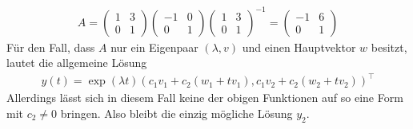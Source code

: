 \begin{solution}
\begin{align*}
A =
  \begin{pmatrix}
    1 & 3 \\ 0 & 1
  \end{pmatrix}
  \begin{pmatrix}
    -1 & 0 \\ 0 & 1
  \end{pmatrix}
  \begin{pmatrix}
    1 & 3 \\ 0 & 1
  \end{pmatrix}^{-1}
  =
  \begin{pmatrix}
    -1 & 6 \\ 0 & 1
  \end{pmatrix}
\end{align*}
Für den Fall, dass $A$ nur ein Eigenpaar $(\lambda,v)$ und einen Hauptvektor $w$
besitzt, lautet die allgemeine Lösung
\begin{align*}
  y(t) = \exp(\lambda t)(c_1v_1 + c_2(w_1 + tv_1),c_1v_2 + c_2(w_2 + tv_2))^{\top}
\end{align*}
Allerdings lässt sich in diesem Fall keine der obigen Funktionen auf so eine Form
mit $c_2 \neq 0$ bringen. Also bleibt die einzig mögliche Lösung $y_2$.
\end{solution}
